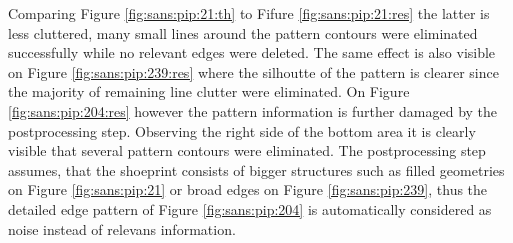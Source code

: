 \documentclass[draft,final]{vutinfth} %
\begin{document}
Comparing Figure \ref{fig:sans:pip:21:th} to  Fifure \ref{fig:sans:pip:21:res} the latter is less cluttered, many small lines around the pattern contours were eliminated successfully while no relevant edges were deleted.
The same effect is also visible on Figure \ref{fig:sans:pip:239:res} where the silhoutte of the pattern is clearer since the majority of remaining line clutter were eliminated.
On Figure \ref{fig:sans:pip:204:res} however the pattern information is further damaged by the postprocessing step.
Observing the right side of the bottom area it is clearly visible that several pattern contours were eliminated.
The postprocessing step assumes, that the shoeprint consists of bigger structures such as filled geometries on Figure \ref{fig:sans:pip:21} or broad edges on Figure \ref{fig:sans:pip:239}, thus the detailed edge pattern of Figure \ref{fig:sans:pip:204} is automatically considered as noise instead of relevans information.
\end{document}

